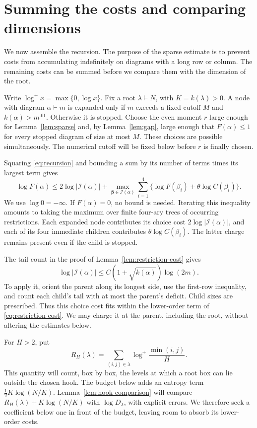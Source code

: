 \section{Summing the costs and comparing dimensions}\label{sec:tree}
We now assemble the recursion. The purpose of the sparse estimate is to prevent costs from accumulating indefinitely on diagrams with a long row or column. The remaining costs can be summed before we compare them with the dimension of the root.

Write $\log^+x=\max\{0,\log x\}$. Fix a root $\lambda\vdash N$, with $K=k(\lambda)>0$. A node with diagram $\alpha\vdash m$ is expanded only if $m$ exceeds a fixed cutoff $M$ and $k(\alpha)>m^{.01}$. Otherwise it is stopped. Choose the even moment $r$ large enough for Lemma~\ref{lem:sparse} and, by Lemma~\ref{lem:gap}, large enough that $F(\alpha)\le1$ for every stopped diagram of size at most $M$. These choices are possible simultaneously. The numerical cutoff will be fixed below before $r$ is finally chosen.

Squaring \eqref{eq:recursion} and bounding a sum by its number of terms times its largest term gives
\begin{equation}\label{eq:log-recursion}
 \log F(\alpha)\le2\log|\mathcal I(\alpha)|
 +\max_{\boldsymbol\beta\in\mathcal I(\alpha)}
     \sum_{i=1}^4\{\log F(\beta_i)+\theta\log C(\beta_i)\}.
\end{equation}
We use $\log0=-\infty$. If $F(\alpha)=0$, no bound is needed. Iterating this inequality amounts to taking the maximum over finite four-ary trees of occurring restrictions. Each expanded node contributes its choice cost $2\log|\mathcal I(\alpha)|$, and each of its four immediate children contributes $\theta\log C(\beta_i)$. The latter charge remains present even if the child is stopped.

The tail count in the proof of Lemma~\ref{lem:restriction-cost} gives
\[
 \log|\mathcal I(\alpha)|
 \le C(1+\sqrt{k(\alpha)})\log(2m).
\]
To apply it, orient the parent along its longest side, use the first-row inequality, and count each child's tail with at most the parent's deficit. Child sizes are prescribed. Thus this choice cost fits within the lower-order term of \eqref{eq:restriction-cost}. We may charge it at the parent, including the root, without altering the estimates below.

For $H>2$, put
\[
 R_H(\lambda)=\sum_{(i,j)\in\lambda}\log^+\frac{\min(i,j)}H.
\]
This quantity will count, box by box, the levels at which a root box
can lie outside the chosen hook. The budget below adds an entropy
term $\tfrac12K\log(N/K)$. Lemma~\ref{lem:hook-comparison} will
compare $R_H(\lambda)+K\log(N/K)$ with $\log D_\lambda$, with
explicit errors. We therefore seek a coefficient below one in front
of the budget, leaving room to absorb its lower-order costs.

